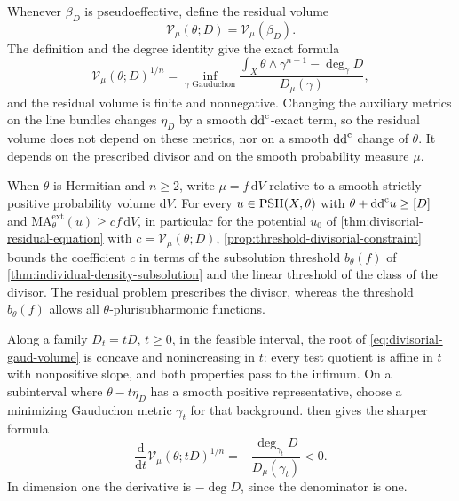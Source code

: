 Whenever $\beta_D$ is pseudoeffective, define the residual volume
\[
 \mathcal V_\mu(\theta;D)=\mathcal V_\mu(\beta_D).
\]
The definition and the degree identity give the exact formula
\begin{equation}\label{eq:divisorial-gaud-volume}
 \mathcal V_\mu(\theta;D)^{1/n}
   =\inf_{\gamma\text{ Gauduchon}}
     \frac{\int_X\theta\wedge\gamma^{n-1}-\deg_\gamma D}
          {D_\mu(\gamma)},
\end{equation}
and the residual volume is finite and nonnegative. Changing the auxiliary metrics on the line bundles changes $\eta_D$ by a smooth $\mathrm{dd}^{\mathrm{c}}$-exact term, so the residual volume does not depend on these metrics, nor on a smooth $\mathrm{dd}^{\mathrm{c}}$ change of $\theta$. It depends on the prescribed divisor and on the smooth probability measure $\mu$.



When $\theta$ is Hermitian and $n\geq2$, write $\mu=f\,\mathrm{d}V$ relative to a smooth strictly positive probability volume $\mathrm{d}V$. For every $u\in\mathrm{PSH}(X,\theta)$ with $\theta+\mathrm{dd}^{\mathrm{c}} u\geq[D]$ and $\mathrm{MA}^{\mathrm{ext}}_\theta(u)\geq cf\,\mathrm{d}V$, in particular for the potential $u_0$ of \cref{thm:divisorial-residual-equation} with $c=\mathcal V_\mu(\theta;D)$, \cref{prop:threshold-divisorial-constraint} bounds the coefficient $c$ in terms of the subsolution threshold $b_\theta(f)$ of \cref{thm:individual-density-subsolution} and the linear threshold of the class of the divisor. The residual problem prescribes the divisor, whereas the threshold $b_\theta(f)$ allows all $\theta$-plurisubharmonic functions.

Along a family $D_t=tD$, $t\geq0$, in the feasible interval, the root of \eqref{eq:divisorial-gaud-volume} is concave and nonincreasing in $t$: every test quotient is affine in $t$ with nonpositive slope, and both properties pass to the infimum. On a subinterval where $\theta-t\eta_D$ has a smooth positive representative, choose a minimizing Gauduchon metric $\gamma_t$ for that background.  then gives the sharper formula
\begin{equation}\label{eq:divisorial-volume-derivative}
 \frac{\mathrm{d}}{\mathrm{d}t}\mathcal V_\mu(\theta;tD)^{1/n}
       =-\frac{\deg_{\gamma_t}D}{D_\mu(\gamma_t)}<0.
\end{equation}
In dimension one the derivative is $-\deg D$, since the denominator is one.




